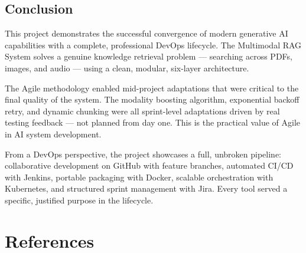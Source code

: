 \documentclass[12pt,a4paper]{report}
\begin{document}
\section{Conclusion}

This project demonstrates the successful convergence of modern generative AI capabilities with a complete, professional DevOps lifecycle. The Multimodal RAG System solves a genuine knowledge retrieval problem --- searching across PDFs, images, and audio --- using a clean, modular, six-layer architecture.

The Agile methodology enabled mid-project adaptations that were critical to the final quality of the system. The modality boosting algorithm, exponential backoff retry, and dynamic chunking were all sprint-level adaptations driven by real testing feedback --- not planned from day one. This is the practical value of Agile in AI system development.

From a DevOps perspective, the project showcases a full, unbroken pipeline: collaborative development on GitHub with feature branches, automated CI/CD with Jenkins, portable packaging with Docker, scalable orchestration with Kubernetes, and structured sprint management with Jira. Every tool served a specific, justified purpose in the lifecycle.

\chapter*{References}
\end{document}
